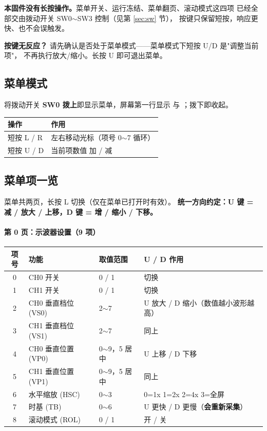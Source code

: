 \documentclass[UTF8,a4paper,11pt]{ctexart}
\begin{document}
\begin{tipbox}
\textbf{本固件没有长按操作。}菜单开关、运行冻结、菜单翻页、滚动模式这四项
已经全部交由拨动开关 SW0$\sim$SW3 控制（见第 \ref{sec:sw} 节），
按键只保留短按，响应更快、也不会误触发。
\end{tipbox}

\begin{tipbox}
\textbf{按键无反应？} 请先确认是否处于菜单模式——菜单模式下短按 U/D 是"调整当前项"，
不再执行放大/缩小。长按 U 即可退出菜单。
\end{tipbox}

\subsection{菜单模式}

将拨动开关 \textbf{SW0 拨上}即显示菜单，屏幕第一行显示  与 ；拨下即收起。

\begin{center}
\small
\begin{tabular}{ll}
\toprule
操作 & 作用\\
\midrule
短按 L / R & 左右移动光标（项号 0$\sim$7 循环）\\
短按 U / D & 当前项数值 加 / 减\\
\bottomrule
\end{tabular}
\end{center}

\subsection{菜单项一览}

菜单共两页，长按 L 切换（仅在菜单已打开时有效）。
\textbf{统一方向约定：U 键 = 减 / 放大 / 上移，D 键 = 增 / 缩小 / 下移。}

\paragraph{第 0 页：示波器设置（9 项）}
\begin{center}
\small
\begin{tabular}{clll}
\toprule
项号 & 功能 & 取值范围 & U / D 作用\\
\midrule
0 & CH0 开关 & 0 / 1 & 切换\\
1 & CH1 开关 & 0 / 1 & 切换\\
2 & CH0 垂直档位 (VS0) & 2$\sim$7 & U 放大 / D 缩小（数值越小波形越高）\\
3 & CH1 垂直档位 (VS1) & 2$\sim$7 & 同上\\
4 & CH0 垂直位置 (VP0) & 0$\sim$9，5 居中 & U 上移 / D 下移\\
5 & CH1 垂直位置 (VP1) & 0$\sim$9，5 居中 & 同上\\
6 & 水平缩放 (HSC) & 0$\sim$3 & 0=1x 1=2x 2=4x 3=全屏\\
7 & 时基 (TB) & 0$\sim$6 & U 更快 / D 更慢（\textbf{会重新采集}）\\
8 & 滚动模式 (ROL) & 0 / 1 & 开 / 关\\
\bottomrule
\end{tabular}
\end{center}
\end{document}
